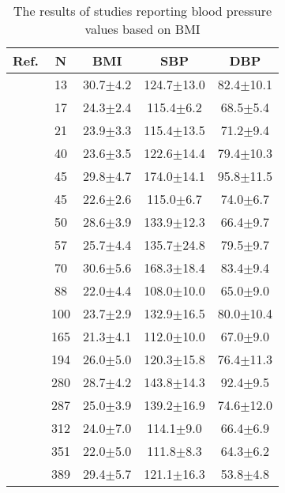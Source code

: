 \documentclass[journal,article,moreauthors]{Definitions/mdpi}
\begin{document}
\begin{table}[tb]
\centering
\caption{The results of studies reporting blood pressure values based on BMI}\label{Tab: BMI}
\small{
\begin{tabular}{rcccc}
\toprule
\textbf{Ref.} & \textbf{N} & \textbf{BMI} &\textbf{SBP} &\textbf{DBP} \\
\hline
\citep{Tibana2013-ve} & 13 & 30.7$\pm$4.2 & 124.7$\pm$13.0 & 82.4$\pm$10.1
\\\hline
\citep{Karatzi2013-yr} & 17  & 24.3$\pm$2.4 & 115.4$\pm$6.2 & 68.5$\pm$5.4
\\\hline
\citep{Fantin2016-bt} & 21  & 23.9$\pm$3.3 & 115.4$\pm$13.5 & 71.2$\pm$9.4
\\\hline
\citep{Papakonstantinou2016-mj} & 40 & 23.6$\pm$3.5 & 122.6$\pm$14.4 & 79.4$\pm$10.3
\\\hline
\citep{Kayrak2010-lk} & 45 & 29.8$\pm$4.7 & 174.0$\pm$14.1 & 95.8$\pm$11.5
\\\hline
\citep{Monnard2017-je} & 45 & 22.6$\pm$2.6 & 115.0$\pm$6.7 & 74.0$\pm$6.7
\\\hline
\citep{cunha2017acute} & 50 & 28.6$\pm$3.9 & 133.9$\pm$12.3 & 66.4$\pm$9.7
\\\hline
\citep{Netea2003} & 57 & 25.7$\pm$4.4 & 135.7$\pm$24.8 & 79.5$\pm$9.7
\\\hline
\citep{Kayrak2010-lk} & 70 & 30.6$\pm$5.6 & 168.3$\pm$18.4 & 83.4$\pm$9.4
\\\hline
\citep{talukder2016effect} & 88 & 22.0$\pm$4.4 & 108.0$\pm$10.0 & 65.0$\pm$9.0
\\\hline
\citep{Xu2019-rx} & 100 & 23.7$\pm$2.9 & 132.9$\pm$16.5 & 80.0$\pm$10.4
\\\hline
\citep{Azar2016-eg} & 165 & 21.3$\pm$4.1 & 112.0$\pm$10.0 & 67.0$\pm$9.0
\\\hline
\citep{talukder2016effect} & 194 & 26.0$\pm$5.0 & 120.3$\pm$15.8 & 76.4$\pm$11.3
\\\hline
\citep{krzesinski2016diagnostic} & 280 & 28.7$\pm$4.2 & 143.8$\pm$14.3 & 92.4$\pm$9.5
\\\hline
\citep{Li2019-ax} & 287 & 25.0$\pm$3.9 & 139.2$\pm$16.9 & 74.6$\pm$12.0
\\\hline
\citep{Wang2006-jk} & 312 & 24.0$\pm$7.0 & 114.1$\pm$9.0 & 66.4$\pm$6.9
\\\hline
\citep{Wang2006-jk} & 351 & 22.0$\pm$5.0 & 111.8$\pm$8.3 & 64.3$\pm$6.2
\\\hline
\citep{Walker2019-oe} & 389  & 29.4$\pm$5.7 & 121.1$\pm$16.3 & 53.8$\pm$4.8

\end{tabular}}
\end{table}
\end{document}
